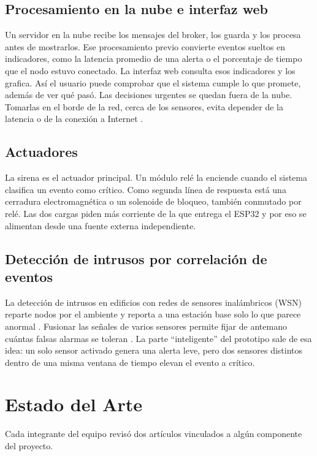 \documentclass[conference]{IEEEtran}
\begin{document}
\subsection{Procesamiento en la nube e interfaz web}
Un servidor en la nube recibe los mensajes del broker, los guarda y los procesa antes de mostrarlos. Ese procesamiento previo convierte eventos sueltos en indicadores, como la latencia promedio de una alerta o el porcentaje de tiempo que el nodo estuvo conectado. La interfaz web consulta esos indicadores y los grafica. Así el usuario puede comprobar que el sistema cumple lo que promete, además de ver qué pasó. Las decisiones urgentes se quedan fuera de la nube. Tomarlas en el borde de la red, cerca de los sensores, evita depender de la latencia o de la conexión a Internet \cite{shi2016edge}.

\subsection{Actuadores}
La sirena es el actuador principal. Un módulo relé la enciende cuando el sistema clasifica un evento como crítico. Como segunda línea de respuesta está una cerradura electromagnética o un solenoide de bloqueo, también conmutado por relé. Las dos cargas piden más corriente de la que entrega el ESP32 y por eso se alimentan desde una fuente externa independiente.

\subsection{Detección de intrusos por correlación de eventos}
La detección de intrusos en edificios con redes de sensores inalámbricos (WSN) reparte nodos por el ambiente y reporta a una estación base solo lo que parece anormal \cite{walchli2009building}. Fusionar las señales de varios sensores permite fijar de antemano cuántas falsas alarmas se toleran \cite{pugh2015fusion}. La parte ``inteligente'' del prototipo sale de esa idea: un solo sensor activado genera una alerta leve, pero dos sensores distintos dentro de una misma ventana de tiempo elevan el evento a crítico.

\section{Estado del Arte}
\label{sec:estado-arte}

Cada integrante del equipo revisó dos artículos vinculados a algún componente del proyecto.
\end{document}
